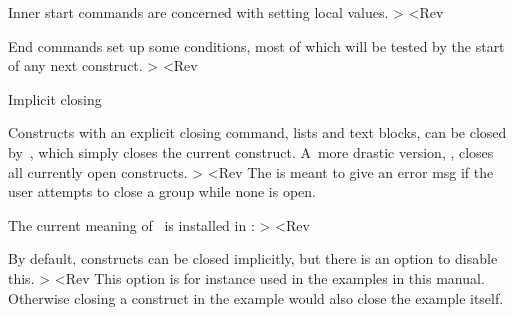 Inner start commands are concerned with setting local values.
\Ver>
\def\inner@start@commands{%
    \nxp\Open@Group\CSname{\@class}\CSname{\@name}%
The \cs{Open@Group} call makes it possible to track down groups
that have inadvertendly been left open. Since we now know the
name we can give helpful error msgs.
\Ver>
    \install@stop<Rev
Install the right implicit closing, see~\ref[sec:implicit:close]
and~\ref[imp:implicit:close].
\Ver>
    \ifleft@embedded@construct
    \else \nxp\hold@parskip 
        \nxp\@defaulteverypar
        \ifwhiteleft@defined \advance\leftskip \the\@whiteleft \relax \fi
        \ifwhiteright@defined \advance\rightskip \the\@whiteright \relax \fi
        \nxp\let\nxp\par=\nxp\@par %
        \inside@indent \first@indent
    \fi
    \advance\nest@depth\@ne<Rev
The nest depth is used for determining indentation levels.
\Ver>
    }<Rev

End commands set up some conditions, most of which will be tested
by the start of any next construct.
\Ver>
\def\inner@end@commands{%
    \nxp\Close@Group\CSname{\@class}\CSname{\@name}%
    \ifright@embedded@construct \else \nxp\leavehmode \fi
    \@afterpenalty
    \ifright@embedded@construct \else \nxp\@vwhite{\the\@whiteafter}\fi
    }
\def\outer@end@commands{%
    \the\after@toks
    \ifright@embedded@construct 
        \nxp\@headedno \nxp\esp@hack
    \else
        \after@indent \nxp\dono@parskip
    \fi}<Rev

 Implicit closing

Constructs with an explicit closing command, lists and text blocks,
can be closed by~\cs{>}, which simply closes the current
construct. A~more drastic version, \cs{>]}, closes all currently
open constructs.
\Ver>
\def\outer@stop@command{\Emessage{Vacuous group closing}}
\let\default@stop@command\outer@stop@command
\def\>{\default@stop@command%
    \ifNextChar]{%
        \ifx\default@stop@command\outer@stop@command
            \xp\take@one
        \else \xp\>\fi}{}}<Rev
The  is meant to give an error msg if the
user attempts to close a group while none is open.

The current meaning of~\cs{>} is installed in
:
\Ver>
\def\install@stop{\if@implicitclose
        \def\nxp\default@stop@command
               {\CSname{\stop@command}}%
    \else \let\nxp\default@stop@command
              \nxp\outer@stop@command 
    \fi}<Rev

By default, constructs can be closed implicitly, but there is an
option  to disable this.
\Ver>
\newif\if@implicitclose
\add@generic@default{\@implicitcloseyes}
<Rev
This option is for instance used in the examples in this manual.
Otherwise closing a construct in the example would also close the
example itself.

\ImpNoteStop

\endinput